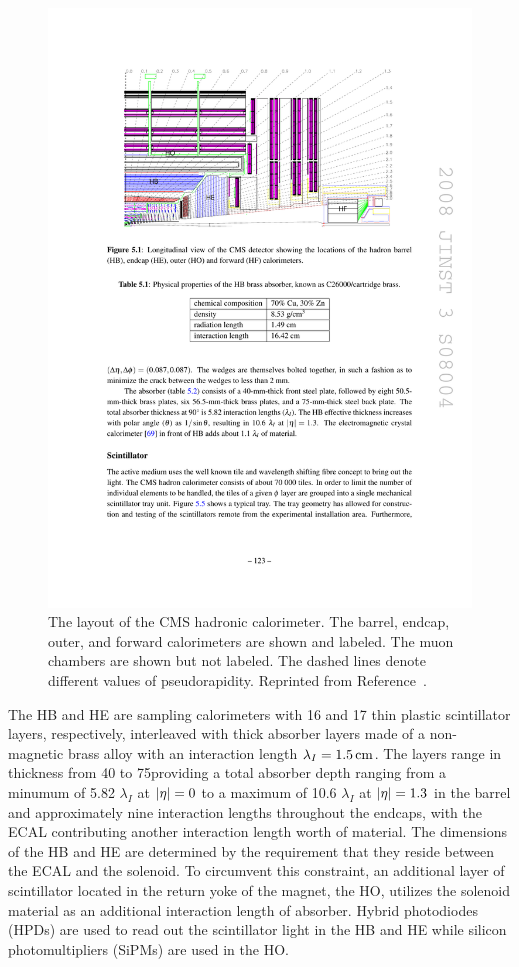 \begin{figure}[htbp]
  \centering
  \includegraphics[width=\textwidth]{Detector/Figures/cms_hcal.pdf}
  \caption{
    The layout of the CMS hadronic calorimeter.
    The barrel, endcap, outer, and forward calorimeters are shown and labeled.
    The muon chambers are shown but not labeled. 
    The dashed lines denote different values of pseudorapidity.
    Reprinted from Reference~\cite{}. %
  }
  \label{fig:cms_hcal}
\end{figure}

The HB and HE are sampling calorimeters with 16 and 17 thin plastic scintillator layers, respectively,  interleaved with thick absorber layers made of a non-magnetic brass alloy with an interaction length $\lambda_I = 1.5\,\text{cm}$.
The layers range in thickness from 40 to 75\mm providing a total absorber depth ranging from a minumum of 5.82 $\lambda_I$ at $\lvert \eta \rvert=0$ to a maximum of 10.6 $\lambda_I$ at $\lvert \eta \rvert = 1.3$ in the barrel and approximately nine interaction lengths throughout the endcaps, with the ECAL contributing another interaction length worth of material.
The dimensions of the HB and HE are determined by the requirement that they reside between the ECAL and the solenoid. 
To circumvent this constraint, an additional layer of scintillator located in the return yoke of the magnet, the HO, utilizes the solenoid material as an additional interaction length of absorber.
Hybrid photodiodes (HPDs) are used to read out the scintillator light in the HB and HE while silicon photomultipliers (SiPMs) are used in the HO.

